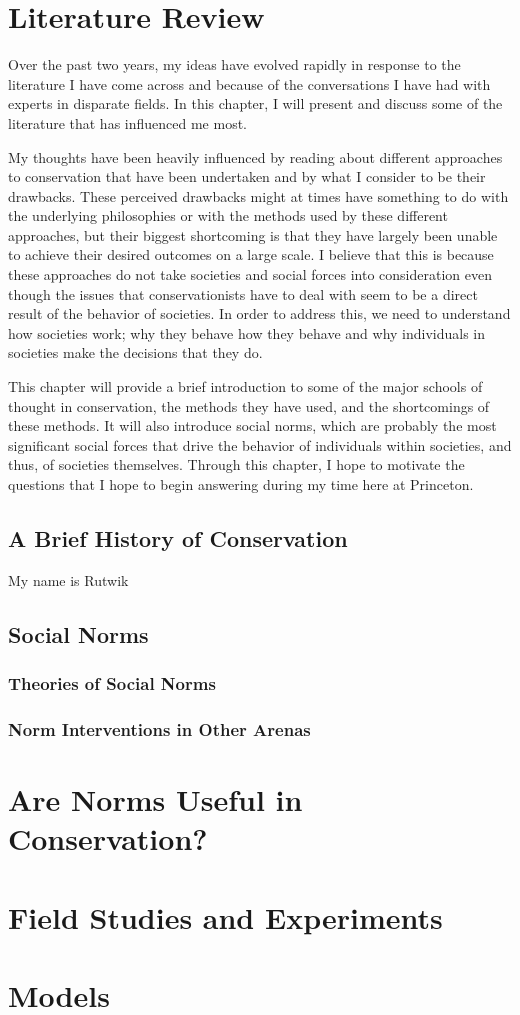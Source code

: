 \documentclass[rutwik_proposal.tex]{subfiles}
\begin{document}
\chapter{Literature Review}\label{ch:litrev}

Over the past two years, my ideas have evolved rapidly in response to the literature I have come across and because of the conversations I have had with experts in disparate fields. In this chapter, I will present and discuss some of the literature that has influenced me most.

My thoughts have been heavily influenced by reading about different approaches to conservation that have been undertaken and by what I consider to be their drawbacks. These perceived drawbacks might at times have something to do with the underlying philosophies or with the methods used by these different approaches, but their biggest shortcoming is that they have largely been unable to achieve their desired outcomes on a large scale. I believe that this is because these approaches do not take societies and social forces into consideration even though the issues that conservationists have to deal with seem to be a direct result of the behavior of societies. In order to address this, we need to understand how societies work; why they behave how they behave and why individuals in societies make the decisions that they do.

This chapter will provide a brief introduction to some of the major schools of thought in conservation, the methods they have used, and the shortcomings of these methods. It will also introduce social norms, which are probably the most significant social forces that drive the behavior of individuals within societies, and thus, of societies themselves. Through this chapter, I hope to motivate the questions that I hope to begin answering during my time here at Princeton.

\section{A Brief History of Conservation}\label{sec:history}
My name is Rutwik

\section{Social Norms}\label{sec:norms}
\subsection{Theories of Social Norms}\label{subsec:theories}
\subsection{Norm Interventions in Other Arenas}\label{subsec:interventions}

\chapter{Are Norms Useful in Conservation?}\label{ch:usefulness}

\chapter{Field Studies and Experiments}\label{ch:field}

\chapter{Models}\label{ch:models}
\end{document}
